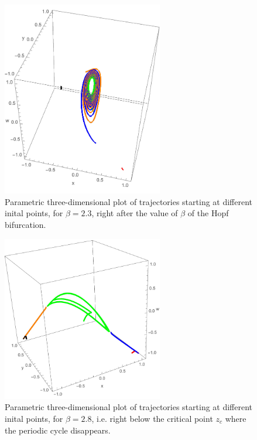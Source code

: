 \documentclass[a4paper,10pt,leqno]{amsart}
\theoremstyle{plain}
\begin{document}
\begin{figure}   
\centering   
\includegraphics[width=7cm]{3D_sim_b=2_3.pdf}   
\caption{Parametric three-dimensional plot of trajectories starting at different inital points, for $\beta = 2.3$, right after the value of $\beta$ of the Hopf bifurcation.}   
\label{3D_pic2}   
\end{figure}   

\begin{figure}   
\centering   
\includegraphics[width=7cm]{3D_sim_b=2_8.pdf}   
\caption{Parametric three-dimensional plot of trajectories starting at different inital points, for $\beta = 2.8$, i.e. right below the critical point $z_c$ where the periodic cycle disappears.}   
\label{3D_pic3}   
\end{figure}   
\end{document}
